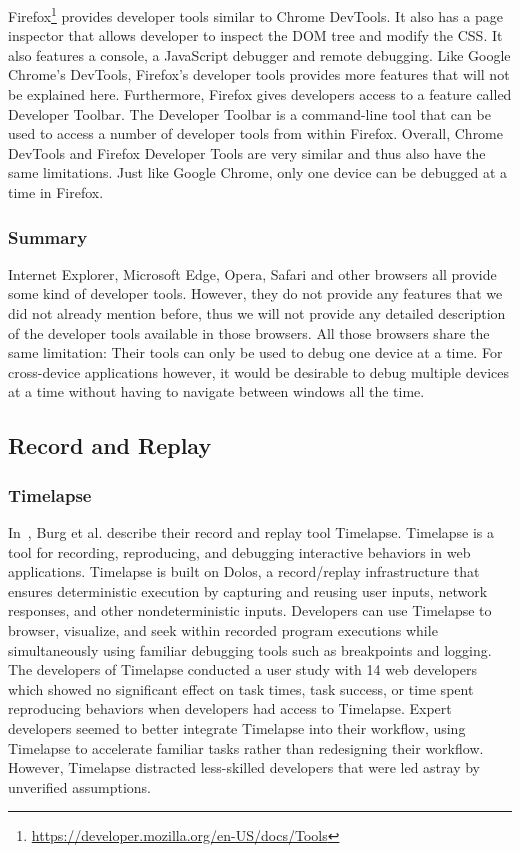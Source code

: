 Firefox\footnote{\url{https://developer.mozilla.org/en-US/docs/Tools}} provides developer tools similar to Chrome DevTools. It also has a page inspector that allows developer to inspect the DOM tree and modify the CSS. It also features a console, a JavaScript debugger and remote debugging. Like Google Chrome's DevTools, Firefox's developer tools provides more features that will not be explained here. Furthermore, Firefox gives developers access to a feature called Developer Toolbar. The Developer Toolbar is a command-line tool that can be used to access a number of developer tools from within Firefox. Overall, Chrome DevTools and Firefox Developer Tools are very similar and thus also have the same limitations. Just like Google Chrome, only one device can be debugged at a time in Firefox.

\subsubsection{Summary}

Internet Explorer, Microsoft Edge, Opera, Safari and other browsers all provide some kind of developer tools. However, they do not provide any features that we did not already mention before, thus we will not provide any detailed description of the developer tools available in those browsers. All those browsers share the same limitation: Their tools can only be used to debug one device at a time. For cross-device applications however, it would be desirable to debug multiple devices at a time without having to navigate between windows all the time.

\subsection{Record and Replay}

\subsubsection{Timelapse}

In~\cite{timelapse2013}, Burg et al. describe their record and replay tool Timelapse. Timelapse is a tool for recording, reproducing, and debugging interactive behaviors in web applications. Timelapse is built on Dolos, a record/replay infrastructure that ensures deterministic execution by capturing and reusing user inputs, network responses, and other nondeterministic inputs. Developers can use Timelapse to browser, visualize, and seek within recorded program executions while simultaneously using familiar debugging tools such as breakpoints and logging. The developers of Timelapse conducted a user study with 14 web developers which showed no significant effect on task times, task success, or time spent reproducing behaviors when developers had access to Timelapse. Expert developers seemed to better integrate Timelapse into their workflow, using Timelapse to accelerate familiar tasks rather than redesigning their workflow. However, Timelapse distracted less-skilled developers that were led astray by unverified assumptions.

